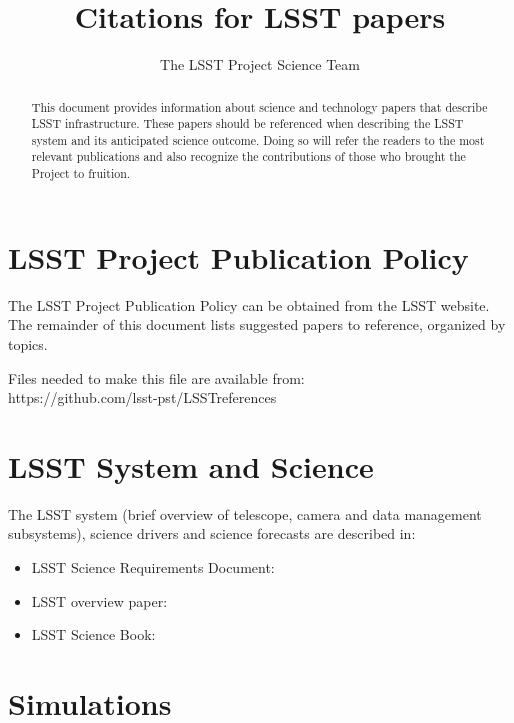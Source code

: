 \documentclass[12pt]{article}
\begin{document}
\title{Citations for LSST papers}
\author{The LSST Project Science Team}
\maketitle


\begin{abstract}
This document provides information about science and technology papers that describe LSST infrastructure.
These papers should be referenced when describing the LSST system and its anticipated science
outcome. Doing so will refer the readers to the most relevant publications and also recognize the 
contributions of those who brought the Project to fruition.
\end{abstract}


\tableofcontents

\newpage
\section{LSST Project Publication Policy} 

The LSST Project Publication Policy can be obtained from the LSST website.
The remainder of this document lists suggested papers to reference, organized by topics. 

Files needed to make this file are available from: \\
https://github.com/lsst-pst/LSSTreferences

\section{LSST System and Science}

The LSST system (brief overview of telescope, camera and data management subsystems),
science drivers and science forecasts are described in:

\begin{itemize}
\item LSST Science Requirements Document: \cite{lsstSRD}
\item LSST overview paper: \cite{ivezic2008lsst} 
\item LSST Science Book: \cite{abell2009lsst}
\end{itemize}


\section{Simulations}
\end{document}
